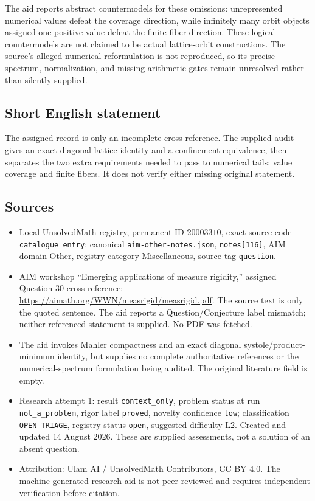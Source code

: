 \documentclass[11pt]{article}
\begin{document}
The aid reports abstract countermodels for these omissions: unrepresented numerical values defeat the coverage direction, while infinitely many orbit objects assigned one positive value defeat the finite-fiber direction. These logical countermodels are not claimed to be actual lattice-orbit constructions. The source's alleged numerical reformulation is not reproduced, so its precise spectrum, normalization, and missing arithmetic gates remain unresolved rather than silently supplied.
\subsection{Short English statement}
The assigned record is only an incomplete cross-reference. The supplied audit gives an exact diagonal-lattice identity and a confinement equivalence, then separates the two extra requirements needed to pass to numerical tails: value coverage and finite fibers. It does not verify either missing original statement.
\subsection{Sources}
\begin{itemize}
\item Local UnsolvedMath registry, permanent ID \(20003310\), exact source code \texttt{catalogue entry}; canonical \texttt{aim-other-notes.json}, \texttt{notes[116]}, AIM domain Other, registry category Miscellaneous, source tag \texttt{question}.
\item AIM workshop ``Emerging applications of measure rigidity,'' assigned Question 30 cross-reference: \url{https://aimath.org/WWN/measrigid/measrigid.pdf}. The source text is only the quoted sentence. The aid reports a Question/Conjecture label mismatch; neither referenced statement is supplied. No PDF was fetched.
\item The aid invokes Mahler compactness and an exact diagonal systole/product-minimum identity, but supplies no complete authoritative references or the numerical-spectrum formulation being audited. The original literature field is empty.
\item Research attempt 1: result \texttt{context\_only}, problem status at run \texttt{not\_a\_problem}, rigor label \texttt{proved}, novelty confidence \texttt{low}; classification \texttt{OPEN-TRIAGE}, registry status \texttt{open}, suggested difficulty L2. Created and updated 14 August 2026. These are supplied assessments, not a solution of an absent question.
\item Attribution: Ulam AI / UnsolvedMath Contributors, CC BY 4.0. The machine-generated research aid is not peer reviewed and requires independent verification before citation.
\end{itemize}
\end{document}
